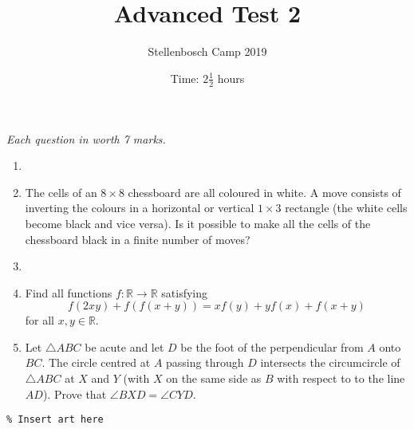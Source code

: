 \documentclass{article}
\title{Advanced Test 2}
\author{Stellenbosch Camp 2019}
\date{Time: $2\frac{1}{2}$ hours}
\begin{document}
\maketitle
\thispagestyle{empty}

\hfill\textit{Each question in worth 7 marks.}

\vspace{24pt}


\begin{enumerate}[1.]

\item %


\item %
The cells of an $8 \times 8$ chessboard are all coloured in white.
A move consists of inverting the colours in a horizontal or vertical $1 \times 3$ rectangle (the white cells become black and vice versa).
Is it possible to make all the cells of the chessboard black in a finite number of moves?


\item 


\item
Find all functions $f: \mathbb{R} \to \mathbb{R}$ satisfying
\[ f(2xy) +f(f(x+y)) = xf(y) + yf(x) +f(x+y) \]
for all $x,y \in \mathbb{R}$.


\item %
Let $\triangle ABC$ be acute and let $D$ be the foot of the perpendicular from $A$ onto $BC$.
The circle centred at $A$ passing through $D$ intersects the circumcircle of $\triangle ABC$ at $X$ and $Y$ (with $X$ on the same side as $B$ with respect to to the line $AD$).
Prove that $\angle BXD = \angle CYD$.

\end{enumerate}


\vfill
\begin{center}
\begin{BVerbatim}
\end{BVerbatim}
\end{center}
\end{document}
